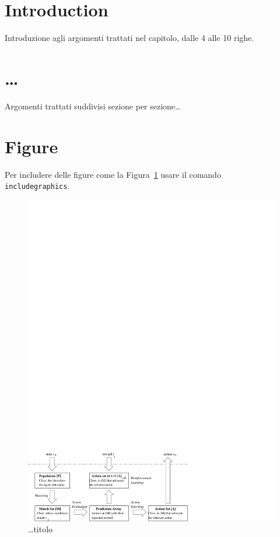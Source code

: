 \section{Introduction}
Introduzione agli argomenti trattati nel capitolo, dalle 4 alle 10 righe.

\section{\dots}
Argomenti trattati suddivisi sezione per sezione\dots

\section{Figure}
Per includere delle figure come la Figura~\ref{fig:figura} 
usare il comando \texttt{\\includegraphics}.

\begin{figure}[tbh]
  \centering
  \includegraphics[scale=0.7]{images/esempio}
  \caption{\dots titolo}
  \label{fig:figura}
\end{figure}


